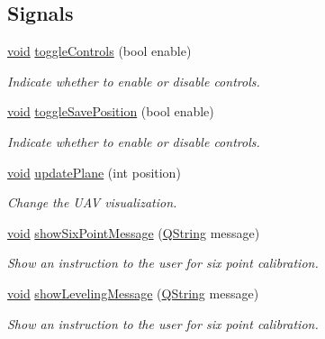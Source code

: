 \subsection*{\-Signals}
\begin{DoxyCompactItemize}
\item 
\hyperlink{group___u_a_v_objects_plugin_ga444cf2ff3f0ecbe028adce838d373f5c}{void} \hyperlink{class_calibration_acd2d18249304f970ea2b88be25ffacf4}{toggle\-Controls} (bool enable)
\begin{DoxyCompactList}\small\item\em \-Indicate whether to enable or disable controls. \end{DoxyCompactList}\item 
\hyperlink{group___u_a_v_objects_plugin_ga444cf2ff3f0ecbe028adce838d373f5c}{void} \hyperlink{class_calibration_a5c0c4477675b95dc0417496eb667f187}{toggle\-Save\-Position} (bool enable)
\begin{DoxyCompactList}\small\item\em \-Indicate whether to enable or disable controls. \end{DoxyCompactList}\item 
\hyperlink{group___u_a_v_objects_plugin_ga444cf2ff3f0ecbe028adce838d373f5c}{void} \hyperlink{class_calibration_abf64232b5acd7d93c98cf1394b0547d8}{update\-Plane} (int position)
\begin{DoxyCompactList}\small\item\em \-Change the \-U\-A\-V visualization. \end{DoxyCompactList}\item 
\hyperlink{group___u_a_v_objects_plugin_ga444cf2ff3f0ecbe028adce838d373f5c}{void} \hyperlink{class_calibration_a3cd34992a8bea67dbc42f5a4dbe1d08d}{show\-Six\-Point\-Message} (\hyperlink{group___u_a_v_objects_plugin_gab9d252f49c333c94a72f97ce3105a32d}{\-Q\-String} message)
\begin{DoxyCompactList}\small\item\em \-Show an instruction to the user for six point calibration. \end{DoxyCompactList}\item 
\hyperlink{group___u_a_v_objects_plugin_ga444cf2ff3f0ecbe028adce838d373f5c}{void} \hyperlink{class_calibration_a398c9601c7103ec24323e32474d20757}{show\-Leveling\-Message} (\hyperlink{group___u_a_v_objects_plugin_gab9d252f49c333c94a72f97ce3105a32d}{\-Q\-String} message)
\begin{DoxyCompactList}\small\item\em \-Show an instruction to the user for six point calibration. \end{DoxyCompactList}\item 

\end{DoxyCompactItemize}
